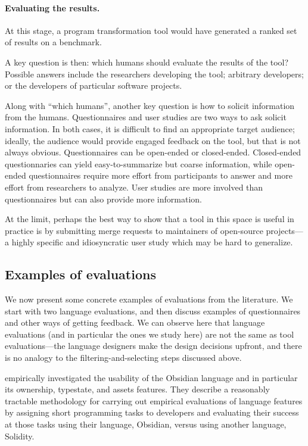 \paragraph{Evaluating the results.} At this stage, a program
transformation tool would have generated a ranked set of results on a
benchmark.  

A key question is then: which humans should evaluate the
results of the tool?  Possible answers include the researchers
developing the tool; arbitrary developers; or the developers of
particular software projects.

Along with ``which humans'', another key question is how to solicit
information from the humans. Questionnaires and user studies are two
ways to ask solicit information. In both cases, it is difficult to
find an appropriate target audience; ideally, the audience would
provide engaged feedback on the tool, but that is not always obvious.
Questionnaires can be open-ended or closed-ended. Closed-ended
questionnaries can yield easy-to-summarize but coarse information,
while open-ended questionnaires require more effort from participants
to answer and more effort from researchers to analyze. User studies
are more involved than questionnaires but can also provide more information.

At the limit, perhaps the
best way to show that a tool in this space is useful in practice is by
submitting merge requests to maintainers of open-source projects---a 
highly specific and idiosyncratic user study which may be hard to generalize.

\subsection{Examples of evaluations}
We now present some concrete examples of evaluations from the
literature. We start with two language evaluations, and then
discuss examples of questionnaires and other ways of getting feedback. We can observe
here that language evaluations (and in particular the ones we study
here) are not the same as tool evaluations---the language designers
make the design decisions upfront, and there is no analogy to the
filtering-and-selecting steps discussed above.

 empirically
investigated the usability of the Obsidian language and in particular
its ownership, typestate, and assets features. They describe a
reasonably tractable methodology for carrying out empirical
evaluations of language features by assigning short programming tasks
to developers and evaluating their success at those tasks using their
language, Obsidian, versus using another language, Solidity.


